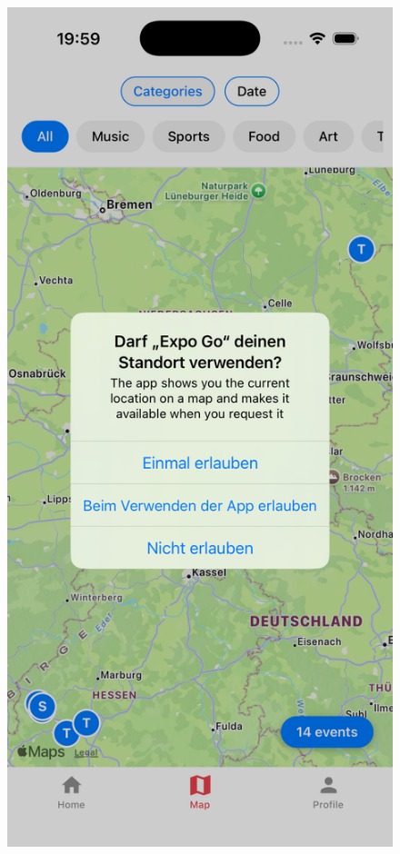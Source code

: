 \begin{figure}[htbp]
      \centering
      \begin{minipage}{0.48\textwidth}
            \centering
            \includegraphics[width=\textwidth]{images/copilot_screenshots/6. 1. Version das MapScreens - Screenshot-copilot.png}

\end{minipage}
\end{figure}
